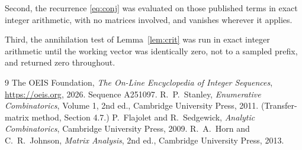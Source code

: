 \documentclass[11pt,a4paper]{article}
\theoremstyle{plain}
\theoremstyle{definition}
\begin{document}
Second, the recurrence \eqref{eq:conj} was evaluated on those published terms in exact
integer arithmetic, with no matrices involved, and vanishes wherever it applies.

Third, the annihilation test of Lemma~\ref{lem:crit} was run in exact integer arithmetic
until the working vector was identically zero, not to a sampled prefix, and returned zero
throughout.

\begin{thebibliography}{9}
 The OEIS Foundation, \emph{The On-Line Encyclopedia of Integer
Sequences}, \url{https://oeis.org}, 2026. Sequence A251097.
 R.~P.~Stanley, \emph{Enumerative Combinatorics}, Volume 1, 2nd ed.,
Cambridge University Press, 2011. (Transfer-matrix method, Section 4.7.)
 P.~Flajolet and R.~Sedgewick, \emph{Analytic Combinatorics}, Cambridge
University Press, 2009.
 R.~A.~Horn and C.~R.~Johnson, \emph{Matrix Analysis}, 2nd ed., Cambridge
University Press, 2013.
\end{thebibliography}
\end{document}
